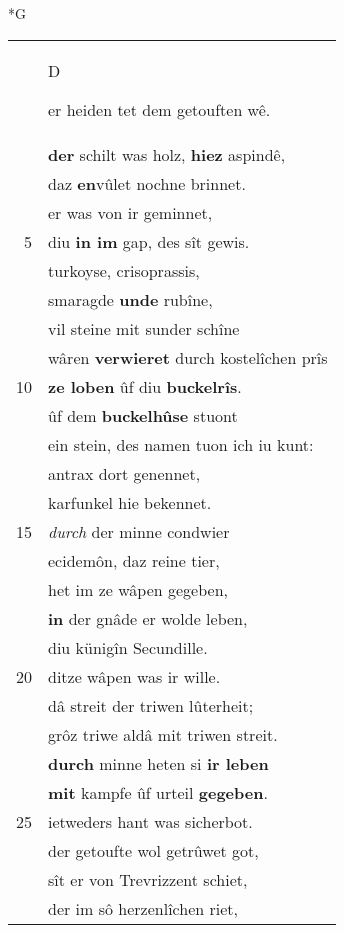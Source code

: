 \documentclass[8pt,a4paper,notitlepage]{article}
\begin{document}
\newpage
\begin{table}[ht]
\begin{minipage}[t]{0.5\linewidth}
\small
\begin{center}*G
\end{center}
\begin{tabular}{rl}
 & \begin{large}D\end{large}er heiden tet dem getouften wê.\\ 
 & \textbf{der} schilt was holz, \textbf{hiez} aspindê,\\ 
 & daz \textbf{en}vûlet nochne brinnet.\\ 
 & er was von ir geminnet,\\ 
5 & diu \textbf{in im} gap, des sît gewis.\\ 
 & turkoyse, crisoprassis,\\ 
 & smaragde \textbf{unde} rubîne,\\ 
 & vil steine mit sunder schîne\\ 
 & wâren \textbf{verwieret} durch kostelîchen prîs\\ 
10 & \textbf{ze loben} ûf diu \textbf{buckelrîs}.\\ 
 & ûf dem \textbf{buckelhûse} stuont\\ 
 & ein stein, des namen tuon ich iu kunt:\\ 
 & antrax dort genennet,\\ 
 & karfunkel hie bekennet.\\ 
15 & \textit{durch} der minne condwier\\ 
 & ecidemôn, daz reine tier,\\ 
 & het im ze wâpen gegeben,\\ 
 & \textbf{in} der gnâde er wolde leben,\\ 
 & diu künigîn Secundille.\\ 
20 & ditze wâpen was ir wille.\\ 
 & dâ streit der triwen lûterheit;\\ 
 & grôz triwe aldâ mit triwen streit.\\ 
 & \textbf{durch} minne heten si \textbf{ir leben}\\ 
 & \textbf{mit} kampfe ûf urteil \textbf{gegeben}.\\ 
25 & ietweders hant was sicherbot.\\ 
 & der getoufte wol getrûwet got,\\ 
 & sît er von Trevrizzent schiet,\\ 
 & der im sô herzenlîchen riet,\\ 

\end{tabular}
\end{minipage}
\end{table}
\end{document}
